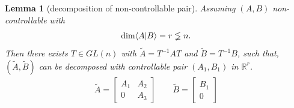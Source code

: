 \documentclass[a4paper,11pt,fleqn]{book}
\newtheorem{lemma}[theorem]{Lemma}
\theoremstyle{definition}
\theoremstyle{remark}
\let\ran\relax
\DeclareMathOperator{\ran}{ran}
\begin{document}
\begin{lemma}[decomposition of non-controllable pair]
	Assuming $(A, B)$ non-controllable with
	\begin{align*}
		\dim \langle A|\ran B \rangle = r \lneqq n . 
	\end{align*}
	Then there exists $T \in GL(n)$ with $\tilde{A} = T^{-1} A T$ and $\tilde{B} = T^{-1} B$, such that, $(\tilde{A}, \tilde{B})$ can be decomposed with controllable pair $(A_1, B_1)$ in $\mathbb{R}^r$. 
	\begin{align*}
		\tilde{A}= 
		\begin{bmatrix}
			A_1 & A_2 \\
			0 & A_3
		\end{bmatrix}
		\qquad \tilde{B} = 
		\begin{bmatrix}
			B_1\\
			0
		\end{bmatrix}
	\end{align*}
\end{lemma}
\end{document}
